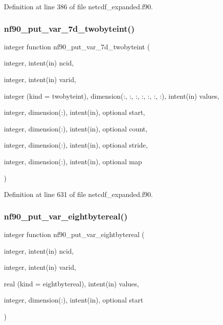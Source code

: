 Definition at line 386 of file netcdf\+\_\+expanded.\+f90.

\mbox{\label{netcdf__expanded_8f90_a281152c58a570d30235574463cf5258b}} 
\subsubsection{\texorpdfstring{nf90\+\_\+put\+\_\+var\+\_\+7d\+\_\+twobyteint()}{nf90\_put\_var\_7d\_twobyteint()}}
{\footnotesize\ttfamily integer function nf90\+\_\+put\+\_\+var\+\_\+7d\+\_\+twobyteint (\begin{DoxyParamCaption}\item[{integer, intent(in)}]{ncid,  }\item[{integer, intent(in)}]{varid,  }\item[{integer (kind = twobyteint), dimension(\+:, \+:, \+:, \+:, \+:, \+:, \+:), intent(in)}]{values,  }\item[{integer, dimension(\+:), intent(in), optional}]{start,  }\item[{integer, dimension(\+:), intent(in), optional}]{count,  }\item[{integer, dimension(\+:), intent(in), optional}]{stride,  }\item[{integer, dimension(\+:), intent(in), optional}]{map }\end{DoxyParamCaption})}



Definition at line 631 of file netcdf\+\_\+expanded.\+f90.

\mbox{\label{netcdf__expanded_8f90_a8e8d2b7b9de3bc80891a9d4092be7813}} 
\subsubsection{\texorpdfstring{nf90\+\_\+put\+\_\+var\+\_\+eightbytereal()}{nf90\_put\_var\_eightbytereal()}}
{\footnotesize\ttfamily integer function nf90\+\_\+put\+\_\+var\+\_\+eightbytereal (\begin{DoxyParamCaption}\item[{integer, intent(in)}]{ncid,  }\item[{integer, intent(in)}]{varid,  }\item[{real (kind = eightbytereal), intent(in)}]{values,  }\item[{integer, dimension(\+:), intent(in), optional}]{start }\end{DoxyParamCaption})}



